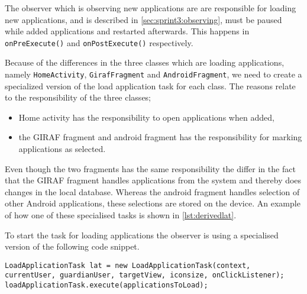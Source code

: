 The observer which is observing new applications are are responsible for loading new applications, and is described in \cref{sec:sprint3:observing}, must be paused while added applications and restarted afterwards.
This happens in \lstinline!onPreExecute()! and \lstinline!onPostExecute()! respectively.

Because of the differences in the three classes which are loading applications, namely \lstinline!HomeActivity!, \lstinline!GirafFragment! and \lstinline!AndroidFragment!, we need to create a specialized version of the load application task for each class.
The reasons relate to the responsibility of the three classes;
\begin{itemize}
	\item Home activity has the responsibility to open applications when added,
	\item the GIRAF fragment and android fragment has the responsibility for marking applications as selected.
\end{itemize}
Even though the two fragments has the same responsibility the differ in the fact that the GIRAF fragment handles applications from the \giraf system and thereby does changes in the local database.
Whereas the android fragment handles selection of other Android applications, these selections are stored on the device.
An example of how one of these specialised tasks is shown in \cref{lst:derivedlat}.

To start the task for loading applications the observer is using a specialised version of the following code snippet.
\begin{lstlisting}[caption={A simplified code snippet for starting loading applications into a view.}, label={lst:simplelat}]
LoadApplicationTask lat = new LoadApplicationTask(context, currentUser, guardianUser, targetView, iconsize, onClickListener);
loadApplicationTask.execute(applicationsToLoad);
\end{lstlisting}

